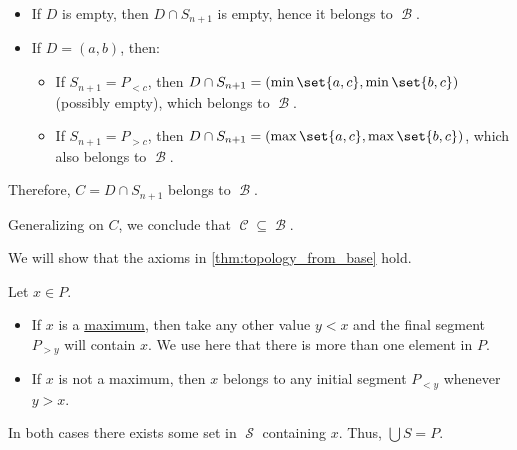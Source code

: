 \begin{defproof}
\begin{itemize}
    \item If \( D \) is empty, then \( D \cap S_{n+1} \) is empty, hence it belongs to \( \mscrB \).

    \item If \( D = (a, b) \), then:
    \begin{itemize}
      \item If \( S_{n+1} = P_{<c} \), then \( D \cap S_{n+1} = (\min\set{a, c}, \min\set{b, c}) \) (possibly empty), which belongs to \( \mscrB \).
      \item If \( S_{n+1} = P_{>c} \), then \( D \cap S_{n+1} = (\max\set{a, c}, \max\set{b, c}) \), which also belongs to \( \mscrB \).
    \end{itemize}
  \end{itemize}

  Therefore, \( C = D \cap S_{n+1} \) belongs to \( \mscrB \).

  Generalizing on \( C \), we conclude that \( \mscrC \subseteq \mscrB \).

   We will show that the axioms in \cref{thm:topology_from_base} hold.

   Let \( x \in P \).

  \begin{itemize}
    \item If \( x \) is a \hyperref[def:extremal_points/maximum_and_minimum]{maximum}, then take any other value \( y < x \) and the final segment \( P_{>y} \) will contain \( x \). We use here that there is more than one element in \( P \).

    \item If \( x \) is not a maximum, then \( x \) belongs to any initial segment \( P_{<y} \) whenever \( y > x \).
  \end{itemize}

  In both cases there exists some set in \( \mscrS \) containing \( x \). Thus, \( \bigcup S = P \).


\end{defproof}
